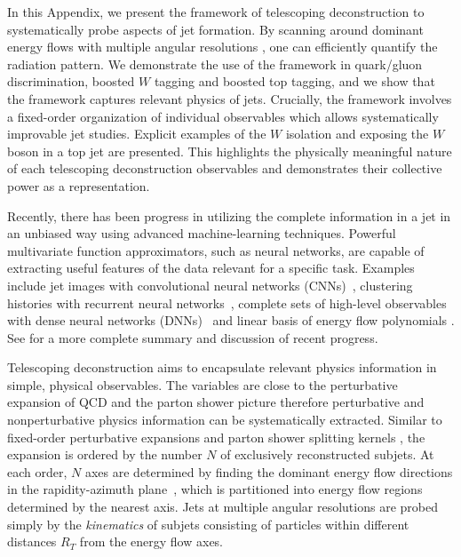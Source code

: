 \documentclass[notoc]{JHEP3}
\begin{document}
In this Appendix, we present the framework of telescoping deconstruction to systematically probe aspects of jet formation. By scanning around dominant energy flows with multiple angular resolutions \cite{Chien:2013kca,Chien:2014hla}, one can efficiently quantify the radiation pattern. We demonstrate the use of the framework in quark/gluon discrimination, boosted $W$ tagging and boosted top tagging, and we show that the framework captures relevant physics of jets. Crucially, the framework involves a fixed-order organization of individual observables which allows systematically improvable jet studies. Explicit examples of the $W$ isolation \cite{Chien:2017xrb} and exposing the $W$ boson in a top jet are presented. This highlights the physically meaningful nature of each telescoping deconstruction observables and demonstrates their collective power as a representation.

Recently, there has been progress in utilizing the complete information in a jet in an unbiased way using advanced machine-learning techniques. Powerful multivariate function approximators, such as neural networks, are capable of extracting useful features of the data relevant for a specific task. Examples include jet images with convolutional neural networks (CNNs)~\cite{Cogan:2014oua,deOliveira:2015xxd,Komiske:2016rsd,Kasieczka:2017nvn}, clustering histories with recurrent neural networks~\cite{Louppe:2017ipp}, complete sets of high-level observables with dense neural networks (DNNs)~\cite{Datta:2017rhs,Datta:2017lxt,Aguilar-Saavedra:2017rzt} and linear basis of energy flow polynomials \cite{Komiske:2017aww}. See \cite{Larkoski:2017jix} for a more complete summary and discussion of recent progress. %

Telescoping deconstruction aims to encapsulate relevant physics information in simple, physical observables. The variables are close to the perturbative expansion of QCD and the parton shower picture therefore perturbative and nonperturbative physics information can be systematically extracted. Similar to fixed-order perturbative expansions and parton shower splitting kernels \cite{Nagy:2017ggp}, the expansion is ordered by the number $N$ of exclusively reconstructed subjets. At each order, $N$ axes are determined by finding the dominant energy flow directions in the rapidity-azimuth plane~\cite{Stewart:2010tn,Chien:2013kca,Stewart:2015waa,Thaler:2015xaa}, which is partitioned into energy flow regions determined by the nearest axis. Jets at multiple angular resolutions are probed simply by the {\sl kinematics} of subjets consisting of particles within different distances $R_T$ from the energy flow axes.
\end{document}
